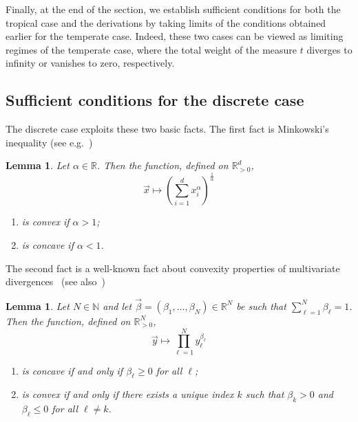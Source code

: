 \documentclass[aps,pra,11pt,onecolumn,nofootinbib,tightenlines]{revtex4-2}
\newtheorem{lemma}[theorem]{Lemma}
\theoremstyle{definition}
\begin{document}
Finally, at the end of the section, we establish sufficient conditions for both the tropical case and the derivations by taking limits of the conditions obtained earlier for the temperate case. Indeed, these two cases can be viewed as limiting regimes of the temperate case, where the total weight of the measure $t$ diverges to infinity or vanishes to zero, respectively.

\subsection{Sufficient conditions for the discrete case}
The discrete case exploits these two basic facts. The first fact is Minkowski's inequality (see e.g.~\cite[Theorem 9]{bullen2013handbook})
\begin{lemma}
\label{lem: Minkowski}
Let $\alpha \in \mathbb{R}$. Then the function, defined on $\mathbb{R}_{>0}^d$,
\begin{equation}
    \vec{x} \longmapsto \left(\sum_{i=1}^d x_i^\alpha\right)^{\frac{1}{\alpha}}
\end{equation}
\begin{enumerate}[itemsep=1pt]
    \item is convex if $\alpha > 1$;
    \item is concave if $\alpha < 1$.
\end{enumerate}
\end{lemma}
The second fact is a well-known fact about convexity properties of multivariate divergences~\cite[Lemma 8]{mu21_renyi} (see also~\cite[Proposition 13]{farooq2024matrix})
\begin{lemma}
\label{lem: Matrix majorization}
Let $N \in \mathbb{N}$ and let $\vec{\beta} = (\beta_1, \dots, \beta_N) \in \mathbb{R}^N$ be such that $\sum_{\ell=1}^N \beta_\ell = 1$. Then the function, defined on $\mathbb{R}_{>0}^N$,
\begin{equation}
    \vec{y} \longmapsto \prod_{\ell=1}^N y_\ell^{\beta_\ell}
\end{equation}
\begin{enumerate}[itemsep=1pt]
    \item is concave if and only if $\beta_\ell \geq 0$ for all $\ell$;
    \label{it: concavity matrix majorization}
    \item is convex if and only if there exists a unique index $k$ such that $\beta_{k} > 0$ and $\beta_\ell \leq 0$ for all $\ell \neq k$.
     \label{it: convexity matrix majorization}
\end{enumerate}
\end{lemma}
\end{document}

